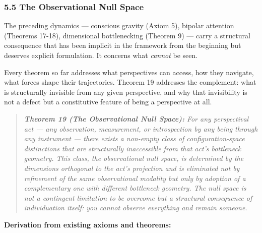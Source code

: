 \subsubsection*{5.5 The Observational Null Space}


The preceding dynamics — conscious gravity (Axiom 5), bipolar attention (Theorems 17-18), dimensional bottlenecking (Theorem 9) — carry a structural consequence that has been implicit in the framework from the beginning but deserves explicit formulation. It concerns what \textit{cannot} be seen.


Every theorem so far addresses what perspectives can access, how they navigate, what forces shape their trajectories. Theorem 19 addresses the complement: what is structurally invisible from any given perspective, and why that invisibility is not a defect but a constitutive feature of being a perspective at all.


\begin{quote}
\itshape
\textbf{Theorem 19 (The Observational Null Space):} \textit{For any perspectival act — any observation, measurement, or introspection by any being through any instrument — there exists a non-empty class of configuration-space distinctions that are structurally inaccessible from that act's bottleneck geometry. This class, the observational null space, is determined by the dimensions orthogonal to the act's projection and is eliminated not by refinement of the same observational modality but only by adoption of a complementary one with different bottleneck geometry. The null space is not a contingent limitation to be overcome but a structural consequence of individuation itself: you cannot observe everything and remain someone.}
\end{quote}


\textbf{Derivation from existing axioms and theorems:}


